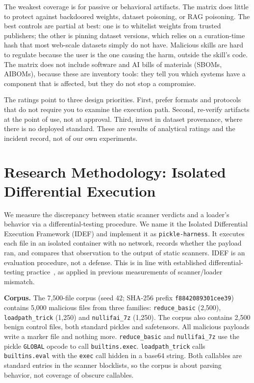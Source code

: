 \documentclass[conference]{IEEEtran}
\begin{document}
The weakest coverage is for passive or behavioral artifacts. The matrix does little to protect against backdoored weights, dataset poisoning, or RAG poisoning. The best controls are partial at best: one is to whitelist weights from trusted publishers; the other is pinning dataset versions, which relies on a curation-time hash that most web-scale datasets simply do not have. Malicious skills are hard to regulate because the user is the one causing the harm, outside the skill's code. The matrix does not include software and AI bills of materials (SBOMs, AIBOMs), because these are inventory tools: they tell you which systems have a component that is affected, but they do not stop a compromise.

The ratings point to three design priorities. First, prefer formats and protocols that do not require you to examine the execution path. Second, re-verify artifacts at the point of use, not at approval. Third, invest in dataset provenance, where there is no deployed standard. These are results of analytical ratings and the incident record, not of our own experiments.

\section{Research Methodology: Isolated Differential Execution}
\label{sec:method}

We measure the discrepancy between static scanner verdicts and a loader's behavior via a differential-testing procedure. We name it the Isolated Differential Execution Framework (IDEF) and implement it as \texttt{pickle-harness}. It executes each file in an isolated container with no network, records whether the payload ran, and compares that observation to the output of static scanners. IDEF is an evaluation procedure, not a defense. This is in line with established differential-testing practice~\cite{pickleball2025}, as applied in previous measurements of scanner/loader mismatch.

\textbf{Corpus.} The 7,500-file corpus (seed 42; SHA-256 prefix \texttt{f8842089301cee39}) contains 5,000 malicious files from three families: \texttt{reduce\_basic} (2,500), \texttt{loadpath\_trick} (1,250) and \texttt{nullifai\_7z} (1,250). The corpus also contains 2,500 benign control files, both standard pickles and safetensors. All malicious payloads write a marker file and nothing more. \texttt{reduce\_basic} and \texttt{nullifai\_7z} use the pickle \texttt{GLOBAL} opcode to call \texttt{builtins.exec}. \texttt{loadpath\_trick} calls \texttt{builtins.eval} with the \texttt{exec} call hidden in a base64 string. Both callables are standard entries in the scanner blocklists, so the corpus is about parsing behavior, not coverage of obscure callables.
\end{document}
